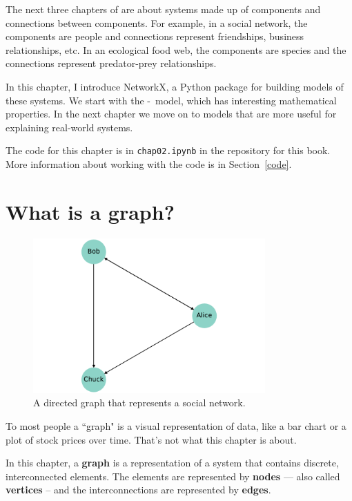 \documentclass[12pt]{book}
\theoremstyle{exercise}
\begin{document}
The next three chapters of are about systems made up of components and connections between components.  For example, in a social network, the components are people and connections represent friendships, business relationships, etc.  In an ecological food web, the components are species and the connections represent predator-prey relationships.

In this chapter, I introduce NetworkX, a Python package for building
models of these systems.  We start with the \Erdos-\Renyi~model,
which has interesting mathematical properties.  In the next
chapter we move on to models that are more useful for explaining
real-world systems.

The code for this chapter is in {\tt chap02.ipynb} in the repository
for this book.  More information about working with the code is
in Section~\ref{code}.


\section{What is a graph?}

\begin{figure}
\centerline{\includegraphics[width=3.5in]{figs/chap02-1.pdf}}
\caption{A directed graph that represents a social network.}
\label{chap02-1}
\end{figure}

To most people a ``graph" is a visual representation of data, like
a bar chart or a plot of stock prices over time.  That's not what this
chapter is about.  


In this chapter, a {\bf graph} is a representation of
a system that contains discrete, interconnected elements.  The
elements are represented by {\bf nodes} --- also called {\bf vertices} --
and the interconnections are represented by {\bf edges}.

\end{document}
